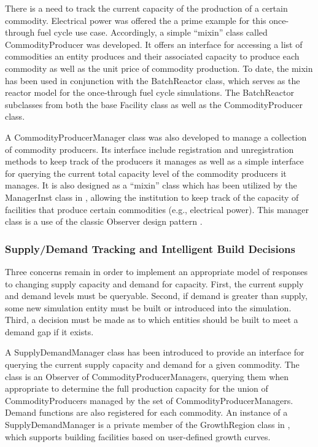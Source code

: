 There is a need to track the current capacity of the production of a certain
commodity. Electrical power was offered the a prime example for this
once-through fuel cycle use case. Accordingly, a simple ``mixin'' class
\cite{ulrich_mixin-based_2001} called CommodityProducer was developed. It offers
an interface for accessing a list of commodities an entity produces and their
associated capacity to produce each commodity as well as the unit price of
commodity production. To date, the mixin has been used in conjunction with the
BatchReactor class, which serves as the reactor model for the once-through fuel
cycle simulations. The BatchReactor subclasses from both the base Facility class
as well as the CommodityProducer class.

A CommodityProducerManager class was also developed to manage a collection of
commodity producers. Its interface include registration and unregistration
methods to keep track of the producers it manages as well as a simple interface
for querying the current total capacity level of the commodity producers it
manages. It is also designed as a ``mixin'' class which has been utilized by the
ManagerInst class in \Cycamore, allowing the institution to keep track of the
capacity of facilities that produce certain commodities (e.g., electrical
power). This manager class is a use of the classic Observer design pattern
\cite{vlissides_design_1995}.

\subsubsection{Supply/Demand Tracking and Intelligent Build Decisions}

Three concerns remain in order to implement an appropriate model of responses to
changing supply capacity and demand for capacity. First, the current supply and
demand levels must be queryable. Second, if demand is greater than supply, some
new simulation entity must be built or introduced into the simulation. Third, a
decision must be made as to which entities should be built to meet a demand gap
if it exists.

A SupplyDemandManager class has been introduced to provide an interface for
querying the current supply capacity and demand for a given commodity. The class
is an Observer of CommodityProducerManagers, querying them when appropriate to
determine the full production capacity for the union of CommodityProducers
managed by the set of CommodityProducerManagers. Demand functions are also
registered for each commodity. An instance of a SupplyDemandManager is a private
member of the GrowthRegion class in \Cycamore, which supports building
facilities based on user-defined growth curves.

